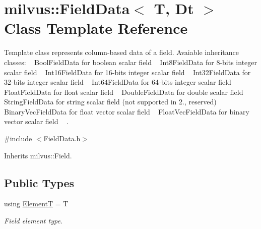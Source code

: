 \hypertarget{classmilvus_1_1_field_data}{}\section{milvus\+:\+:Field\+Data$<$ T, Dt $>$ Class Template Reference}
\label{classmilvus_1_1_field_data}


Template class represents column-\/based data of a field. Avaiable inheritance classes\+: ~\newline
 Bool\+Field\+Data for boolean scalar field ~\newline
 Int8\+Field\+Data for 8-\/bits integer scalar field ~\newline
 Int16\+Field\+Data for 16-\/bits integer scalar field ~\newline
 Int32\+Field\+Data for 32-\/bits integer scalar field ~\newline
 Int64\+Field\+Data for 64-\/bits integer scalar field ~\newline
 Float\+Field\+Data for float scalar field ~\newline
 Double\+Field\+Data for double scalar field ~\newline
 String\+Field\+Data for string scalar field (not supported in 2., reserved) ~\newline
 Binary\+Vec\+Field\+Data for float vector scalar field ~\newline
 Float\+Vec\+Field\+Data for binary vector scalar field ~\newline
.  




{\ttfamily \#include $<$Field\+Data.\+h$>$}



Inherits milvus\+::\+Field.

\subsection*{Public Types}
\begin{DoxyCompactItemize}
\item 
\mbox{\label{classmilvus_1_1_field_data_a921c839e5d8df646cb7a20029ddb17f6}} 
using \hyperlink{classmilvus_1_1_field_data_a921c839e5d8df646cb7a20029ddb17f6}{ElementT} = T
\begin{DoxyCompactList}\small\item\em Field element type. \end{DoxyCompactList}\end{DoxyCompactItemize}
